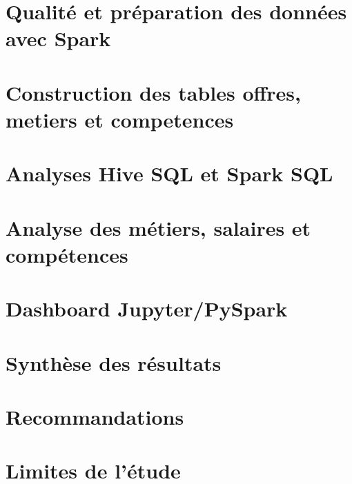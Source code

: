 \documentclass[11pt,a4paper]{report}
\begin{document}
\chapter{Qualité et préparation des données avec Spark}

\chapter{Construction des tables offres, metiers et competences}

\chapter{Analyses Hive SQL et Spark SQL}

\chapter{Analyse des métiers, salaires et compétences}

\chapter{Dashboard Jupyter/PySpark}

\chapter{Synthèse des résultats}
\begin{constat}[Constat 1]
\end{constat}

\chapter{Recommandations}
\begin{recommandation}[Recommandation 1]
\end{recommandation}

\chapter{Limites de l'étude}
\end{document}
